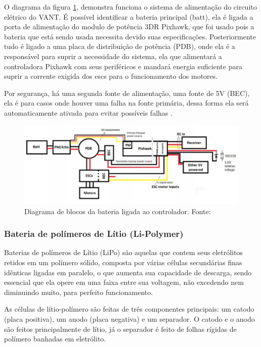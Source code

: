 O diagrama da figura \ref{fig:esquemabateria}, demonstra funciona o sistema de alimentação do circuito elétrico do VANT. É possível identificar 
a bateria principal (batt), ela é ligada a porta de alimentação do modulo de potência 3DR Pixhawk, que foi usado pois a bateria que está sendo
usada necessita devido suas especificações. Posteriormente tudo é ligado a uma placa de distribuição de potência (PDB), onde ela é a
responsável para suprir a necessidade do sistema, ela que alimentará a controladora Pixhawk com seus periféricos e mandará energia
suficiente para suprir a corrente exigida dos escs para o funcionamento dos motores. 

Por segurança, há uma segunda fonte de alimentação, 
uma fonte de 5V (BEC), ela é para casos onde houver uma falha na fonte primária, dessa forma ela será automaticamente ativada para evitar 
possíveis falhas \cite{pix}.

\begin{figure}[H]
    \centering
	\includegraphics[keepaspectratio=true,scale=0.8]{figuras/esquemabateria.eps}
    \caption{Diagrama de blocos da bateria ligada ao controlador. Fonte: \cite{pixhawk}}
    \label{fig:esquemabateria}
\end{figure}


\subsubsection{Bateria de polímeros de Lítio (Li-Polymer)}

Baterias de polímeros de Lítio (LiPo) são aquelas que contem seus eletrólitos retidos em um polímero sólido, 
composta por várias células secundárias finas idênticas ligadas em paralelo, o que aumenta sua capacidade de 
descarga, sendo essencial que ela opere em uma faixa entre sua voltagem, não excedendo nem diminuindo muito, para perfeito funcionamento. \cite{gibbs}

As células de lítio-polímero são feitas de três componentes principais: um catodo (placa positiva), um anodo 
(placa negativa) e um separador. O catodo e o anodo são feitos principalmente de lítio, já o separador é feito 
de folhas rígidas de polímero banhadas em eletrólito. \cite{gibbs}

